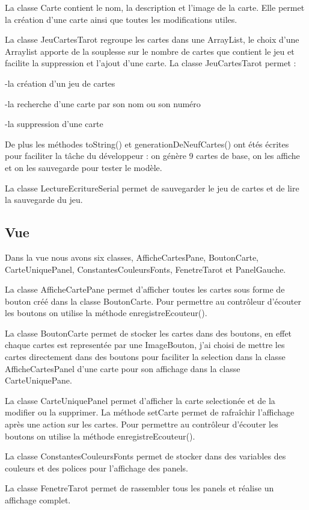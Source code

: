 \documentclass{article}
\begin{document}
La classe Carte contient le nom, la description et l'image de la carte.
Elle permet la création d'une carte ainsi que toutes les modifications utiles.

La classe JeuCartesTarot regroupe les cartes dans une ArrayList, le choix d'une Arraylist apporte de la souplesse sur le nombre de cartes que contient le jeu et facilite la suppression et l'ajout d'une carte.
La classe JeuCartesTarot permet :

-la création d'un jeu de cartes

-la recherche d'une carte par son nom ou son numéro

-la suppression d'une carte

De plus les méthodes toString() et generationDeNeufCartes() ont étés écrites pour faciliter la tâche du développeur : on génère 9 cartes de base, on les affiche et on les sauvegarde pour tester le modèle.

La classe LectureEcritureSerial permet de sauvegarder le jeu de cartes et de lire la sauvegarde du jeu.

\subsection{Vue}
Dans la vue nous avons six classes, AfficheCartesPane, BoutonCarte, CarteUniquePanel, ConstantesCouleursFonts, FenetreTarot et PanelGauche.

La classe AfficheCartePane permet d'afficher toutes les cartes sous forme de bouton créé dans la classe BoutonCarte.
Pour permettre au contrôleur d'écouter les boutons on utilise la méthode enregistreEcouteur().

La classe BoutonCarte permet de stocker les cartes dans des boutons, en effet chaque cartes est representée par une ImageBouton, j'ai choisi de mettre les cartes directement dans des boutons pour faciliter la selection dans la classe AfficheCartesPanel d'une carte pour son affichage dans la classe CarteUniquePane.

La classe CarteUniquePanel permet d'afficher la carte selectionée et de la modifier ou la supprimer.
La méthode setCarte permet de rafraîchir l'affichage après une action sur les cartes.
Pour permettre au contrôleur d'écouter les boutons on utilise la méthode enregistreEcouteur().

La classe ConstantesCouleursFonts permet de stocker dans des variables des couleurs et des polices pour l'affichage des panels.

La classe FenetreTarot permet de rassembler tous les panels et réalise un affichage complet.
\end{document}
